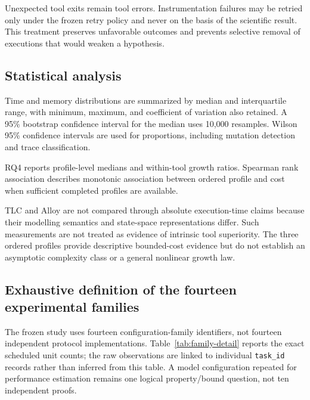Unexpected tool exits remain tool errors. Instrumentation failures may be
retried only under the frozen retry policy and never on the basis of the
scientific result. This treatment preserves unfavorable outcomes and prevents
selective removal of executions that would weaken a hypothesis.

\subsection{Statistical analysis}
\label{subsec:statistical-analysis}

Time and memory distributions are summarized by median and interquartile range,
with minimum, maximum, and coefficient of variation also retained. A 95\%
bootstrap confidence interval for the median uses 10,000 resamples. Wilson 95\%
confidence intervals are used for proportions, including mutation detection and
trace classification.

RQ4 reports profile-level medians and within-tool growth ratios. Spearman rank
association describes monotonic association between ordered profile and cost
when sufficient completed profiles are available.

TLC and Alloy are not compared through absolute execution-time claims because
their modelling semantics and state-space representations differ. Such
measurements are not treated as evidence of intrinsic tool superiority. The
three ordered profiles provide descriptive bounded-cost evidence but do not
establish an asymptotic complexity class or a general nonlinear growth law.

\subsection{Exhaustive definition of the fourteen experimental families}
\label{subsec:individual-families}

The frozen study uses fourteen configuration-family identifiers, not fourteen
independent protocol implementations. Table~\ref{tab:family-detail} reports
the exact scheduled unit counts; the raw observations are linked to individual
\texttt{task\_id} records rather than inferred from this table. A model
configuration repeated for performance estimation remains one logical
property/bound question, not ten independent proofs.


